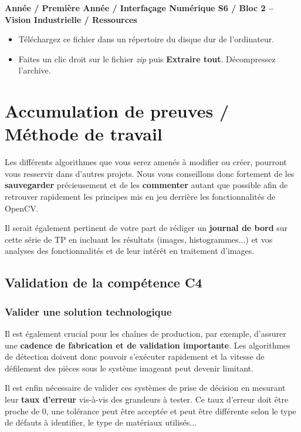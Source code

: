 \documentclass[a4paper,12pt,titlepage]{article} %
\begin{document}
\textbf{Année / Première Année / Interfaçage Numérique S6 / Bloc 2 – Vision Industrielle / Ressources}

\vspace{0.5cm}

\begin{itemize}
	\item Téléchargez ce fichier dans un répertoire du disque dur  de l'ordinateur.
	\item Faites un clic droit sur le fichier \textit{zip} puis \textbf{Extraire tout}. Décompressez l'archive.
\end{itemize}


\newpage

\section{Accumulation de preuves / Méthode de travail}

Les différents algorithmes que vous serez amenés à modifier ou créer, pourront vous resservir dans d'autres projets. Nous vous conseillons donc fortement de les \textbf{sauvegarder} précieusement et de les \textbf{commenter} autant que possible afin de retrouver rapidement les principes mis en jeu derrière les fonctionnalités de OpenCV.

\medskip

Il serait également pertinent de votre part de rédiger un \textbf{journal de bord} sur cette série de TP en incluant les résultats (images, histogrammes...) et vos analyses des fonctionnalités et de leur intérêt en traitement d'images.



\subsection{Validation de la compétence C4}
\subsubsection{Valider une solution technologique}

Il est également crucial pour les chaînes de production, par exemple, d'assurer une \textbf{cadence de fabrication et de validation importante}. Les algorithmes de détection doivent donc pouvoir s'exécuter rapidement et la vitesse de défilement des pièces sous le système imageant peut devenir limitant.

Il est enfin nécessaire de valider ces systèmes de prise de décision en mesurant leur \textbf{taux d'erreur} vis-à-vis des grandeurs à tester. Ce taux d'erreur doit être proche de 0, une tolérance peut être acceptée et peut être différente selon le type de défauts à identifier, le type de matériaux utilisés...
\end{document}
